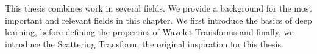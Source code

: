 This thesis combines work in several fields. We provide a background for the
most important and relevant fields in this chapter. We first introduce the
basics of deep learning, before defining the properties of Wavelet Transforms
and finally, we introduce the Scattering Transform, the original inspiration for
this thesis.
